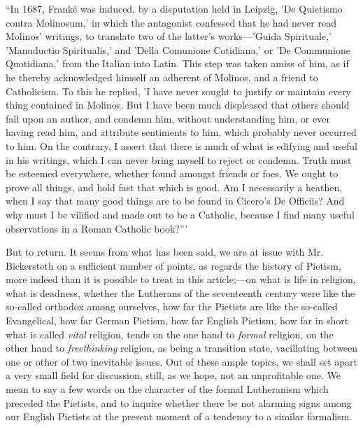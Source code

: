``In 1687, Franké was induced, by a disputation
held in Leipzig, 'De Quietismo contra Molinosum,' in which the
antagonist confessed that he had never read Molinos' writings, to
translate two of the latter's works—'Guida Spirituale,' 'Manuductio
Spiritualis,' and 'Della Comunione Cotidiana,' or 'De Communione
Quotidiana,' from the Italian into Latin. This step was taken amiss of
him, as if he thereby acknowledged himself an adherent of Molinos, and a
friend to Catholicism. To this he replied, 'I have never sought to
justify or maintain every thing contained in Molinos. But I have been
much displeased that others should fall upon an author, and condemn him,
without understanding him, or ever having read him, and attribute
sentiments to him, which probably never occurred to him. On the
contrary, I assert that there is much of what is edifying and useful in
his writings, which I can never bring myself to reject or condemn. Truth
must be esteemed everywhere, whether found amongst friends or foes. We
ought to prove all things, and hold fast that which is good. Am I
necessarily a heathen, when I say that many good things are to be found
in Cicero's De Officiis? And why must I be vilified and made out to be a
Catholic, because I find many useful observations in a Roman Catholic
book?'''

But to return. It seems from what has been said, we
are at issue with Mr. Bickersteth on a sufficient number of points, as
regards the history of Pietism, more indeed than it is possible to treat
in this article;—on what is life in religion, what is deadness,
whether the Lutherans of the seventeenth century were like the so-called
orthodox among ourselves, how far the Pietists are like the so-called
Evangelical, how far German Pietism, how far English Pietism, how far in
short what is called \emph{vital} religion, tends on the one hand to \emph{formal}
religion, on the other hand to \emph{freethinking} religion, as being a
transition state, vacillating between one or other of two inevitable
issues. Out of these ample topics, we shall set apart a very small field
for discussion, still, as we hope, not an unprofitable one. We mean to
say a few words on the character of the formal Lutheranism which
preceded the Pietists, and to inquire whether there be not alarming
signs among our English Pietists at the present moment of a tendency to
a similar formalism.

